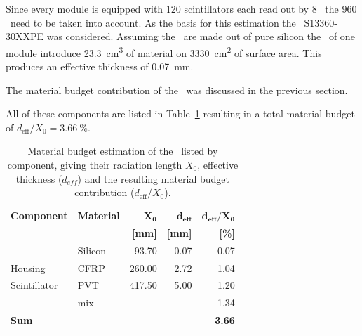 \documentclass[../BTOF_summary.tex]{subfiles}
\begin{document}
Since every module is equipped with 120 scintillators each read out by 8 \sipms\ the 960 \sipms\ need to be taken into account. As the basis for this estimation the \hamamatsu\ S13360-30XXPE was considered. %
Assuming the \sipms\ are made out of pure silicon the \sipms\ of one module introduce \SI{23.3}{cm^3} of material on \SI{3330}{cm^2} of surface area. This produces an effective thickness of \SI{0.07}{mm}.

The material budget contribution of the \railboard\ was discussed in the previous section.

All of these components are listed in Table~\ref{tab:MaterialBudget_total} resulting in a total material budget of $d_{\text{eff}} / X_0 = \SI{3.66}{\percent}$.

\begin{table}[htbp]
	\centering
	\caption[Material budget estimation of the \btofLong .]{Material budget estimation of the \btofLong\ listed by component, giving their radiation length $X_0$, effective thickness ($d_{eff}$) and the resulting material budget contribution ($d_{\text{eff}} / X_0$).}
	\label{tab:MaterialBudget_total}
	\begin{tabular}{@{}llrrr@{}}
		\toprule
		\textbf{Component} & \textbf{Material} & $\mathbf{X_0}$ & $\mathbf{d_{eff}}$ & $\mathbf{d_{eff}/X_{0}}$ \\
		&    & \textbf{[mm]}  & \textbf{[mm]} & \textbf{[\%]}  \\ \midrule
		\sipms       & Silicon & 93.70  & 0.07 & 0.07  \\
		Housing      & CFRP    & 260.00 & 2.72 & 1.04  \\
		Scintillator & PVT     & 417.50 & 5.00 & 1.20  \\
		\railboard   & mix     & -      & -    & 1.34  \\ \midrule
		\textbf{Sum}       &				      &                &                    & \textbf{3.66}            \\ \bottomrule
	\end{tabular}
\end{table}
\end{document}
